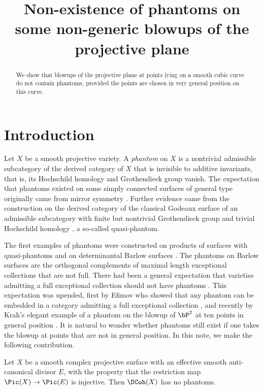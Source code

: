 
\title{Non-existence of phantoms on some non-generic blowups of the projective plane}
\begin{abstract}
We show that blowups of the projective plane at points lying on a smooth cubic curve do not contain phantoms, provided the points are chosen in very general position on this curve.
\end{abstract}
\maketitle


\section{Introduction}

Let $X$ be a smooth projective variety. A \emph{phantom} on $X$ is a nontrivial admissible subcategory of the derived category of $X$ that is invisible to additive invariants, that is, its Hochschild homology and Grothendieck group vanish. The expectation that phantoms existed on some simply connected surfaces of general type originally came from mirror symmetry \cite{DKK13}. Further evidence came from the construction on the derived category of the classical Godeaux surface of an admissible subcategory with finite but nontrivial Grothendieck group and trivial Hochschild homology \cite{BBS13}, a so-called quasi-phantom.

The first examples of phantoms were constructed on products of surfaces with quasi-phantoms \cite{GO13} and on determinantal Barlow surfaces \cite{BBKS15}. The phantoms on Barlow surfaces are the orthogonal complements of maximal length exceptional collections that are not full. There had been a general expectation that varieties admitting a full exceptional collection should not have phantoms \cite{K14}. This expectation was upended, first by Efimov who showed that any phantom can be embedded in a category admitting a full exceptional collection \cite{E20}, and recently by Krah's elegant example of a phantom on the blowup of $\bP^2$ at ten points in general position \cite{K24}. It is natural to wonder whether phantoms still exist if one takes the blowup at points that are not in general position. In this note, we make the following contribution.

\begin{thm} \label{T:forward_main}
Let $X$ be a smooth complex projective surface with an effective smooth anti-canonical divisor $E$, with the property that the restriction map $\Pic(X)\to \Pic(E)$ is injective. Then $\DCoh(X)$ has no phantoms. 
\end{thm}

